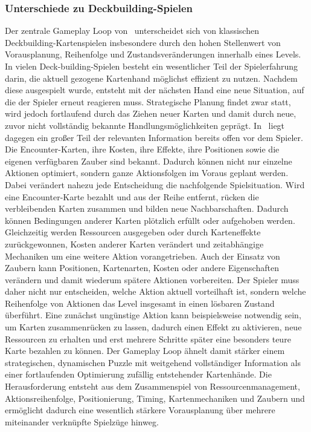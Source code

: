 \subsubsection{Unterschiede zu Deckbuilding-Spielen}
Der zentrale Gameplay Loop von \coc\ unterscheidet sich von klassischen Deckbuilding-Kartenspielen insbesondere durch den hohen Stellenwert von Vorausplanung, Reihenfolge und Zustandsveränderungen innerhalb eines Levels.
In vielen Deck-building-Spielen besteht ein wesentlicher Teil der Spielerfahrung darin, die aktuell gezogene Kartenhand möglichst effizient zu nutzen.
Nachdem diese ausgespielt wurde, entsteht mit der nächsten Hand eine neue Situation, auf die der Spieler erneut reagieren muss.
Strategische Planung findet zwar statt, wird jedoch fortlaufend durch das Ziehen neuer Karten und damit durch neue, zuvor nicht vollständig bekannte Handlungsmöglichkeiten geprägt.
In \coc\ liegt dagegen ein großer Teil der relevanten Information bereits offen vor dem Spieler.
Die Encounter-Karten, ihre Kosten, ihre Effekte, ihre Positionen sowie die eigenen verfügbaren Zauber sind bekannt. Dadurch können nicht nur einzelne Aktionen optimiert, sondern ganze Aktionsfolgen im Voraus geplant werden.
Dabei verändert nahezu jede Entscheidung die nachfolgende Spielsituation.
Wird eine Encounter-Karte bezahlt und aus der Reihe entfernt, rücken die verbleibenden Karten zusammen und bilden neue Nachbarschaften.
Dadurch können Bedingungen anderer Karten plötzlich erfüllt oder aufgehoben werden.
Gleichzeitig werden Ressourcen ausgegeben oder durch Karteneffekte zurückgewonnen, Kosten anderer Karten verändert und zeitabhängige Mechaniken um eine weitere Aktion vorangetrieben.
Auch der Einsatz von Zaubern kann Positionen, Kartenarten, Kosten oder andere Eigenschaften verändern und damit wiederum spätere Aktionen vorbereiten.
Der Spieler muss daher nicht nur entscheiden, welche Aktion aktuell vorteilhaft ist, sondern welche Reihenfolge von Aktionen das Level insgesamt in einen lösbaren Zustand überführt.
Eine zunächst ungünstige Aktion kann beispielsweise notwendig sein, um Karten zusammenrücken zu lassen, dadurch einen Effekt zu aktivieren, neue Ressourcen zu erhalten und erst mehrere Schritte später eine besonders teure Karte bezahlen zu können.
Der Gameplay Loop ähnelt damit stärker einem strategischen, dynamischen Puzzle mit weitgehend vollständiger Information als einer fortlaufenden Optimierung zufällig entstehender Kartenhände.
Die Herausforderung entsteht aus dem Zusammenspiel von Ressourcenmanagement, Aktionsreihenfolge, Positionierung, Timing, Kartenmechaniken und Zaubern und ermöglicht dadurch eine wesentlich stärkere Vorausplanung über mehrere miteinander verknüpfte Spielzüge hinweg.

